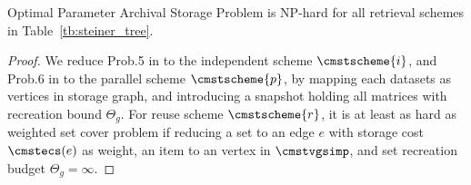 \documentclass[conference]{IEEEtran}
\begin{document}
%

\begin{theorem}
Optimal Parameter Archival Storage Problem is NP-hard for all retrieval schemes in Table~\ref{tb:steiner_tree}.
\end{theorem}
\begin{proof}
We reduce Prob.5 in \cite{vldb15versioning} to the independent scheme $\cmstscheme{i}$, and Prob.6 in \cite{vldb15versioning} to the parallel scheme $\cmstscheme{p}$, by mapping each datasets as vertices in storage graph, and introducing a snapshot holding all matrices with recreation bound $\Theta_g$. For reuse scheme $\cmstscheme{r}$, it is at least as hard as weighted set cover problem if reducing a set to an edge $e$ with storage cost $\cmstecs(e)$ as weight, an item to an vertex in $\cmstvgsimp$, and set recreation budget $\Theta_g = \infty$.
\end{proof}
\end{document}
